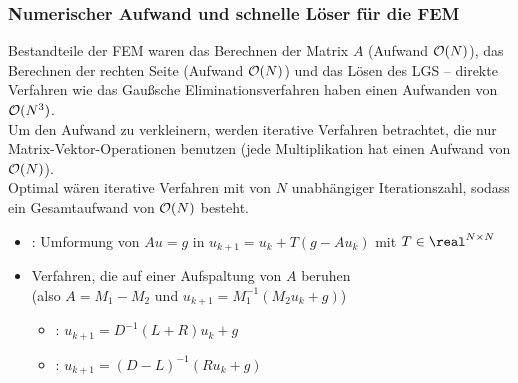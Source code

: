 \pagebreak

\subsubsection{%
    Numerischer Aufwand und schnelle Löser für die FEM%
}

\begin{Bem}
    Bestandteile der FEM waren
    das Berechnen der Matrix $A$ (Aufwand $\mathcal{O}(N)$),
    das Berechnen der rechten Seite (Aufwand $\mathcal{O}(N)$) und
    das Lösen des LGS --
    direkte Verfahren wie das Gaußsche Eliminationsverfahren
    haben einen Aufwanden von $\mathcal{O}(N^3)$.\\
    Um den Aufwand zu verkleinern,
    werden iterative Verfahren betrachtet, die nur
    Matrix-Vektor-Operationen benutzen
    (jede Multiplikation hat einen Aufwand von $\mathcal{O}(N)$).\\
    Optimal wären iterative Verfahren mit von $N$ unabhängiger Iterationszahl,
    sodass ein Gesamtaufwand von $\mathcal{O}(N)$ besteht.
    \begin{itemize}
        \item
        :
        Umformung von $Au = g$ in
        $u_{k+1} = u_k + T(g - Au_k)$ mit $T \in \real^{N \times N}$
        
        \item
        Verfahren, die auf einer Aufspaltung von $A$ beruhen\\
        (also $A = M_1 - M_2$ und $u_{k+1} = M_1^{-1} (M_2 u_k + g)$)
        \begin{itemize}
            \item
            :
            $u_{k+1} = D^{-1} (L + R) u_k + g$
            
            \item
            :
            $u_{k+1} = (D - L)^{-1} (Ru_k + g)$
        \end{itemize}
        

\end{itemize}
\end{Bem}
